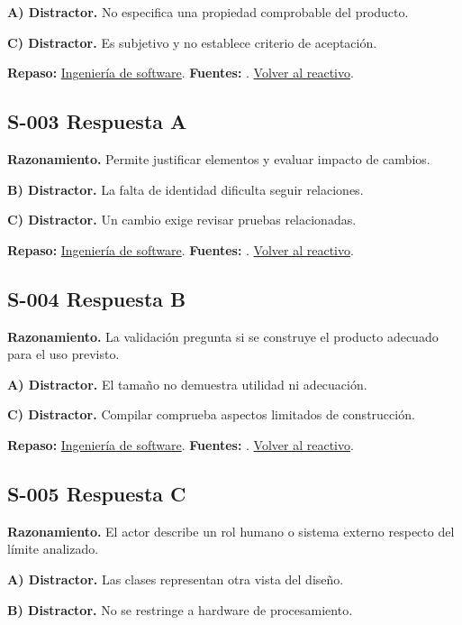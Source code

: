 \textbf{A) Distractor. }No especifica una propiedad comprobable del producto.

\textbf{C) Distractor. }Es subjetivo y no establece criterio de aceptación.

\textbf{Repaso:} \hyperref[sec:s1]{Ingeniería de software}. \textbf{Fuentes:} \cite{scrum,swebok}. \hyperref[q:S-002]{Volver al reactivo}.\par\medskip

\subsection*{S-003 \quad Respuesta A}\label{s:S-003}
\textbf{Razonamiento.} Permite justificar elementos y evaluar impacto de cambios.

\textbf{B) Distractor. }La falta de identidad dificulta seguir relaciones.

\textbf{C) Distractor. }Un cambio exige revisar pruebas relacionadas.

\textbf{Repaso:} \hyperref[sec:s1]{Ingeniería de software}. \textbf{Fuentes:} \cite{scrum,swebok}. \hyperref[q:S-003]{Volver al reactivo}.\par\medskip

\subsection*{S-004 \quad Respuesta B}\label{s:S-004}
\textbf{Razonamiento.} La validación pregunta si se construye el producto adecuado para el uso previsto.

\textbf{A) Distractor. }El tamaño no demuestra utilidad ni adecuación.

\textbf{C) Distractor. }Compilar comprueba aspectos limitados de construcción.

\textbf{Repaso:} \hyperref[sec:s1]{Ingeniería de software}. \textbf{Fuentes:} \cite{scrum,swebok}. \hyperref[q:S-004]{Volver al reactivo}.\par\medskip

\subsection*{S-005 \quad Respuesta C}\label{s:S-005}
\textbf{Razonamiento.} El actor describe un rol humano o sistema externo respecto del límite analizado.

\textbf{A) Distractor. }Las clases representan otra vista del diseño.

\textbf{B) Distractor. }No se restringe a hardware de procesamiento.

